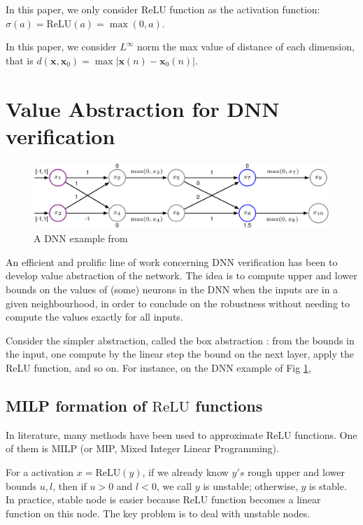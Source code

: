 \documentclass{llncs}
\newcommand{\ReLU}{\mathrm{ReLU}}
\begin{document}
In this paper, we only consider $\ReLU$ function as the activation function: $\sigma(a)=\ReLU(a)=\max(0,a)$. 

In this paper, we consider $L^{\infty}$ norm the max value of distance of each dimension, that is $d(\boldsymbol{x},\boldsymbol{x}_0)=\max |\boldsymbol{x}(n)-\boldsymbol{x}_0(n)|$. 
\fi


\section{Value Abstraction for DNN verification}


\begin{figure}[t!]
	\centering
		\includegraphics[scale=0.4]{example.png}
	\caption{A DNN example from \cite{kneuron}}
	\label{fig1}
	\end{figure}
	

An efficient and prolific line of work concerning DNN verification has been to develop value abstraction of the network. The idea is to compute upper and lower bounds on the values of (some) neurons in the DNN when the inputs are in a given neighbourhood, in order to conclude on the robustness without needing to compute the values exactly for all inputs.

Consider the simpler abstraction, called the box abstraction \cite{deeppoly}: from the bounds in the input, one compute by the linear step the bound on the next layer, apply the ReLU function, and so on.
For instance, on the DNN example of Fig \ref{fig1}, 


\subsection{MILP formation of $\ReLU$ functions}

In literature, many methods have been used to approximate $\ReLU$ functions. One of them is MILP (or MIP, Mixed Integer Linear Programming).

For a activation $x=\ReLU(y)$, if we already know $y's$ rough upper and lower bounds $u,l$, then if $u>0$ and $l<0$, we call $y$ is unstable; otherwise, $y$ is stable. In practice, stable node is easier because $\ReLU$ function becomes a linear function on this node. The key problem is to deal with unstable nodes.
\end{document}
